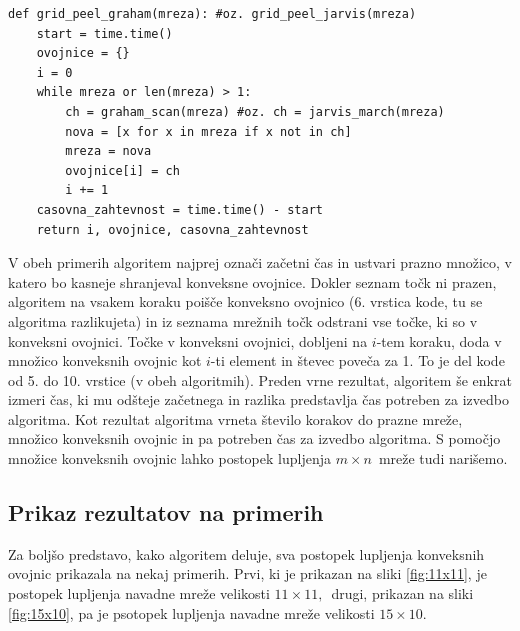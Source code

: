 \documentclass[a4paper]{article}
\begin{document}
\begin{lstlisting}
def grid_peel_graham(mreza): #oz. grid_peel_jarvis(mreza)
    start = time.time()
    ovojnice = {}
    i = 0
    while mreza or len(mreza) > 1:
        ch = graham_scan(mreza) #oz. ch = jarvis_march(mreza)
        nova = [x for x in mreza if x not in ch]
        mreza = nova
        ovojnice[i] = ch
        i += 1
    casovna_zahtevnost = time.time() - start 
    return i, ovojnice, casovna_zahtevnost
\end{lstlisting}

V obeh primerih algoritem najprej označi začetni čas in ustvari prazno množico, v katero bo kasneje shranjeval konveksne ovojnice. Dokler seznam točk ni prazen, algoritem na vsakem koraku 
poišče konveksno ovojnico (6. vrstica kode, tu se algoritma razlikujeta) in iz seznama mrežnih točk odstrani vse točke, ki so v konveksni ovojnici. Točke v konveksni ovojnici, dobljeni na 
$i$-tem koraku, doda v množico konveksnih ovojnic kot $i$-ti element in števec poveča za 1. To je del kode od 5. do 10. vrstice (v obeh algoritmih). Preden vrne rezultat, algoritem še enkrat 
izmeri čas, ki mu odšteje začetnega in razlika predstavlja čas potreben za izvedbo algoritma. Kot rezultat algoritma vrneta število korakov do prazne mreže, množico konveksnih ovojnic in pa 
potreben čas za izvedbo algoritma. S pomočjo množice konveksnih ovojnic lahko postopek lupljenja $m \times n$~mreže tudi narišemo.

\subsection{Prikaz rezultatov na primerih}
Za boljšo predstavo, kako algoritem deluje, sva postopek lupljenja konveksnih ovojnic prikazala na nekaj primerih. Prvi, ki je prikazan na sliki \ref{fig:11x11}, je postopek lupljenja 
navadne mreže velikosti $11 \times 11,$~drugi, prikazan na sliki \ref{fig:15x10}, pa je psotopek lupljenja navadne mreže velikosti $15 \times 10$. 
\end{document}
